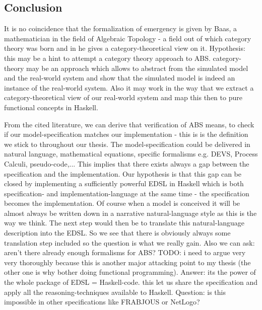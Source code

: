 \subsection{Conclusion}
It is no coincidence that the formalization of emergency is given by Baas, a mathematician in the field of Algebraic Topology - a field out of which category theory was born and in \cite{baas_emergence_1997} he gives a category-theoretical view on it.
Hypothesis: this may be a hint to attempt a category theory approach to ABS. category-theory may be an approach which allows to abstract from the simulated model and the real-world system and show that the simulated model is indeed an instance of the real-world system. Also it may work in the way that we extract a category-theoretical view of our real-world system and map this then to pure functional concepts in Haskell.

From the cited literature, we can derive that verification of ABS means, to check if our model-specification matches our implementation - this is is the definition we stick to throughout our thesis. The model-specification could be delivered in natural language, mathematical equations, specific formalisms e.g. DEVS, Process Calculi, pseudo-code,... This implies that there exists always a gap between the specification and the implementation. Our hypothesis is that this gap can be closed by implementing a sufficiently powerful EDSL in Haskell which is both specification- and implementation-language at the same time - the specification becomes the implementation. Of course when a model is conceived it will be almost always be written down in a narrative natural-language style as this is the way we think. The next step would then be to translate this natural-language description into the EDSL. So we see that there is obviously always some translation step included so the question is what we really gain. Also we can ask: aren't there already enough formalisms for ABS? TODO: i need to argue very very thoroughly because this is another major attacking point to my thesis (the other one is why bother doing functional programming).
Answer: its the power of the whole package of EDSL = Haskell-code. this let us share the specification and apply all the reasoning-techniques available to Haskell. Question: is this impossible in other specifications like FRABJOUS or NetLogo?

